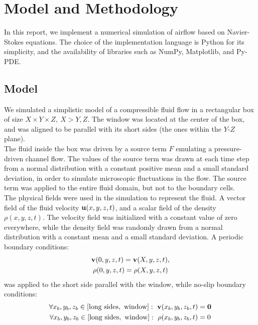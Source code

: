 \section{Model and Methodology} \label{section: methods}
In this report, we implement a numerical simulation of airflow based on Navier-Stokes equations. The choice of the implementation language is Python for its simplicity, and the availability of libraries such as NumPy, Matplotlib, and Py-PDE.

\subsection{Model}
We simulated a simplistic model of a compressible fluid flow in a rectangular box of size $X \times Y \times Z,~X>Y,Z$. The window was located at the center of the box, and was aligned to be parallel with its short sides (the ones within the $Y$-$Z$ plane). \\

The fluid inside the box was driven by a source term $F$ emulating a pressure-driven channel flow. The values of the source term was drawn at each time step from a normal distribution with a constant positive mean and a small standard deviation, in order to simulate microscopic fluctuations in the flow. The source term was applied to the entire fluid domain, but not to the boundary cells. \\

The physical fields were used in the simulation to represent the fluid. A vector field of the fluid velocity $\mathbf{u}(x,y,z,t)$, and a scalar field of the density $\rho(x,y,z,t)$. The velocity field was initialized with a constant value of zero everywhere, while the density field was randomly drawn from a normal distribution with a constant mean and a small standard deviation. A periodic boundary conditions:
\begin{gather}
    \mathbf{v}(0,y,z,t) = \mathbf{v}(X,y,z,t), \\
    \rho(0,y,z,t) = \rho(X,y,z,t)
\end{gather}
was applied to the short side parallel with the window, while no-slip boundary conditions:
\begin{gather}
    \forall x_b,y_b,z_b \in [\text{long sides},~\text{window}]:~ \mathbf{v}(x_b,y_b,z_b, t) = \mathbf{0}\\
    \forall x_b,y_b,z_b \in [\text{long sides},~\text{window}]:~ \rho(x_b,y_b,z_b, t) = 0\\
\end{gather}


